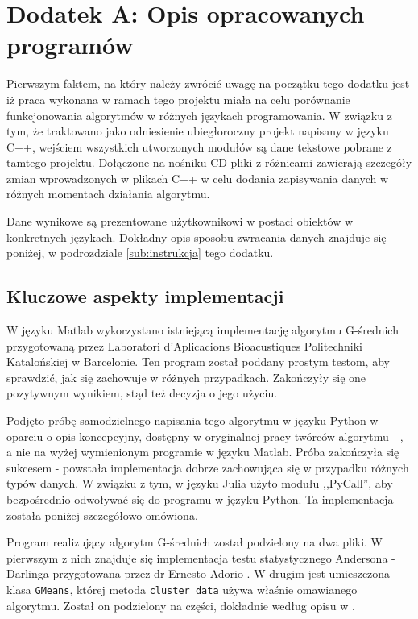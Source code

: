 \section*{Dodatek A: Opis opracowanych programów}
\label{dodatekA}

\qquad Pierwszym faktem, na który należy zwrócić uwagę na początku tego dodatku jest iż praca wykonana w ramach tego projektu miała na celu porównanie funkcjonowania algorytmów w różnych językach programowania. W związku z tym, że traktowano jako odniesienie ubiegłoroczny projekt napisany w języku C++, wejściem wszystkich utworzonych modułów są dane tekstowe pobrane z tamtego projektu. Dołączone na nośniku CD pliki z różnicami zawierają szczegóły zmian wprowadzonych w plikach C++ w celu dodania zapisywania danych w różnych momentach działania algorytmu.

Dane wynikowe są prezentowane użytkownikowi w postaci obiektów w konkretnych językach. Dokładny opis sposobu zwracania danych znajduje się poniżej, w podrozdziale \ref{sub:instrukcja} tego dodatku.

\subsection{Kluczowe aspekty implementacji}
\label{sub:klu_asp}

\qquad W języku Matlab wykorzystano istniejącą implementację algorytmu G-średnich przygotowaną przez Laboratori d'Aplicacions Bioacustiques Politechniki Katalońskiej w Barcelonie. Ten program został poddany prostym testom, aby sprawdzić, jak się zachowuje w różnych przypadkach. Zakończyły się one pozytywnym wynikiem, stąd też decyzja o jego użyciu.

Podjęto próbę samodzielnego napisania tego algorytmu w języku Python w oparciu o opis koncepcyjny, dostępny w oryginalnej pracy twórców algorytmu - \cite{GMeans}, a nie na wyżej wymienionym programie w języku Matlab. Próba zakończyła się sukcesem - powstała implementacja dobrze zachowująca się w przypadku różnych typów danych. W związku z tym, w języku Julia użyto modułu ,,PyCall'', aby bezpośrednio odwoływać się do programu w języku Python. Ta implementacja została poniżej szczegółowo omówiona.

Program realizujący algorytm G-średnich został podzielony na dwa pliki. W pierwszym z nich znajduje się implementacja testu statystycznego Andersona - Darlinga przygotowana przez dr Ernesto Adorio \cite{ad-test-python}. W drugim jest umieszczona klasa \texttt{GMeans}, której metoda \texttt{cluster\_data} używa właśnie omawianego algorytmu. Został on podzielony na części, dokładnie według opisu w \cite{GMeans}.

